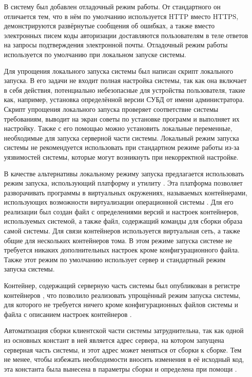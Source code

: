 \tab
В систему был добавлен отладочный режим работы.
От стандартного он отличается тем, что в нём по умолчанию используется HTTP вместо HTTPS, демонстрируются развёрнутые сообщения об ошибках, а также вместо электронных писем коды авторизации доставляются пользователям в теле ответов на запросы подтверждения электронной почты.
Отладочный режим работы используется по умолчанию при локальном запуске системы.

\tab
Для упрощения локального запуска системы был написан скрипт локального запуска.
В его задачи не входит полная настройка системы, так как она включает в себя действия, потенциально небезопасные для устройства пользователя, такие как, например, установка определённой версии СУБД от имени администратора.
Скрипт упрощения локального запуска проверяет соответствие системы требованиям, выводит на экран советы по установке программ и выполняет их настройку.
Также с его помощью можно установить локальные переменные, необходимые для запуска серверной части системы.
Локальный режим запуска системы не рекомендуется использовать при стандартном режиме работы из-за уязвимостей системы, которые могут возникнуть при некорректной настройке.

\tab
В качестве альтернативы локальному режиму запуска предлагается использовать режим запуска, использующий платформу  и утилиту .
Эта платформа позволяет разворачивать программы в виртуальных окружениях, называемых контейнерами, использующих возможности виртуализации операционной системы .
Для его реализации был создан файл с определениями версий и настроек контейнеров, используемых системой, а также файл, содержащий команды для сборки образа самой системы.
Для связи контейнеров используется виртуальная сеть, а также общие для нескольких контейнеров тома.
В этом режиме запуска системе не требуется никаких дополнительных настроек кроме конфигурационного файла.
Также этот режим по умолчанию использует сервер  и стандартный режим запуска системы.

\tab
Контейнер, содержащий серверную часть системы был опубликован в регистре контейнеров \cite{http://ghcr.io/}, что позволило реализовать упрощённый режим запуска системы, для которого не требуется ничего кроме конфигурационных файлов системы и файла с описанием настроек контейнеров .

\tab
Автоматизация сборки клиентской части системы затруднительна, так как одной из основных констант в ней является адрес сервера, на котором запущена серверная часть системы, и этот адрес может меняться от сборки к сборке.
Тем не менее, чтобы избежать необходимости вносить изменения в её исходный код, эта константа была вынесена в параметры сборки и определена при помощи .

